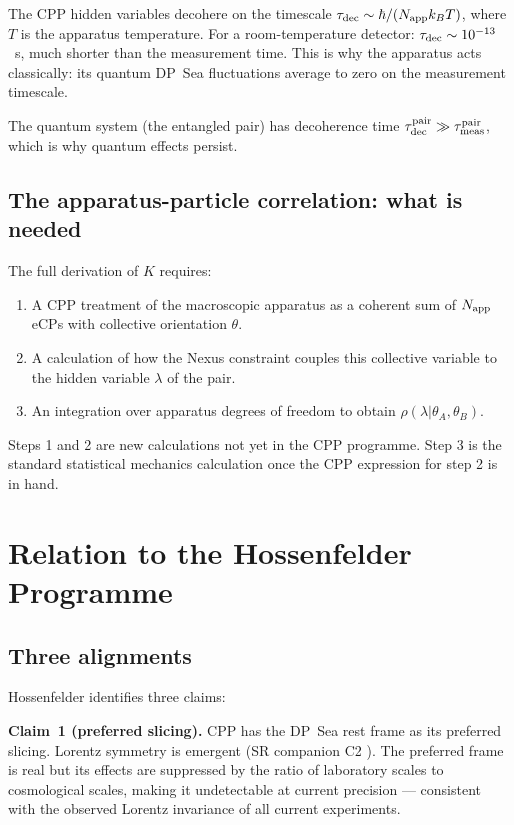 \documentclass[11pt,letterpaper]{article}
\begin{document}
The CPP hidden variables decohere on the timescale $\tau_{\rm dec}
\sim \hbar / (N_{\rm app} k_B T)$, where $T$ is the apparatus
temperature.  For a room-temperature detector: $\tau_{\rm dec} \sim
10^{-13}$~s, much shorter than the measurement time.  This is why
the apparatus acts classically: its quantum DP~Sea fluctuations
average to zero on the measurement timescale.

The quantum system (the entangled pair) has decoherence time
$\tau_{\rm dec}^{\rm pair} \gg \tau_{\rm meas}^{\rm pair}$, which is
why quantum effects persist.

\subsection{The apparatus-particle correlation: what is needed}

The full derivation of $K$ requires:
\begin{enumerate}
\item A CPP treatment of the macroscopic apparatus as a coherent
  sum of $N_{\rm app}$ eCPs with collective orientation $\theta$.
\item A calculation of how the Nexus constraint couples this
  collective variable to the hidden variable $\lambda$ of the pair.
\item An integration over apparatus degrees of freedom to obtain
  $\rho(\lambda | \theta_A, \theta_B)$.
\end{enumerate}

Steps 1 and 2 are new calculations not yet in the CPP programme.
Step 3 is the standard statistical mechanics calculation once the
CPP expression for step 2 is in hand.

\section{Relation to the Hossenfelder Programme}
\label{sec:hossenfelder}

\subsection{Three alignments}

Hossenfelder identifies three claims:

\textbf{Claim~1 (preferred slicing).}
CPP has the DP~Sea rest frame as its preferred slicing.
Lorentz symmetry is emergent (SR companion C2 \citep{abshier_sr}).
The preferred frame is real but its effects are suppressed by the
ratio of laboratory scales to cosmological scales, making it
undetectable at current precision --- consistent with the observed
Lorentz invariance of all current experiments.
\end{document}
